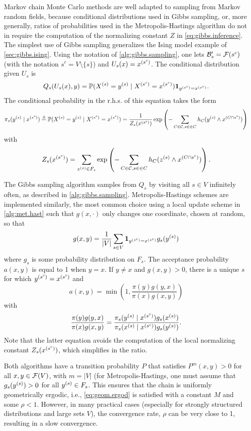 Markov chain Monte Carlo methods are well adapted to sampling from Markov random fields, because conditional distributions used in Gibbs sampling, or, more generally, ratios of probabilities used in the Metropolis-Hastings algorithm do not in require the computation of the normalizing constant $Z$ in \cref{eq:gibbs.inference}. The simplest use of Gibbs sampling generalizes the Ising model example of \cref{sec:gibbs.ising}. Using the notation of \cref{alg:gibbs.sampling}, one lets ${\mathcal B}'_s = {\mathcal F}(s^c)$ (with the notation $s^c = V \setminus \{s\}$) and $U_s(x) = x^{(s^c)}$. The conditional distribution given $U_s$ is 
\[
Q_s(U_s(x), y) = \bm{\mathbb P}(X^{(s)} = y^{(s)}\mid X^{(s^c)} = x^{(s^c)}) {\bm 1}_{y^{(s^c)} = x^{(s^c)}}.
\]
The conditional probability in the r.h.s. of this equation takes the form 
\[
\pi_s(y^{(s)}\mid x^{(s^c)}) \stackrel{{\scriptscriptstyle \Delta}}{=} \bm{\mathbb P}(X^{(s)} = y^{(s)}\mid X^{(s^c)} = x^{(s^c)}) = 
 \frac{1}{Z_s(x^{(s^c)})} \exp\left (- \sum_{C\in {\mathcal C}, s\in \in C} h_C(y^{(s)} \wedge x^{(C\cap s^c)})\right)
\]
with
\[
Z_s(x^{(s^c)}) = \sum_{z^{(s)}\in F_s} \exp\left (- \sum_{C\in {\mathcal C}, s\in \in C} h_C(z^{(s)} \wedge x^{(C\cap s^c)})\right).
\]

The Gibbs sampling algorithm samples from $Q_s$ by visiting all $s\in V$ infinitely often, as described in \cref{alg:gibbs.sampling}. Metropolis-Hastings schemes are implemented similarly, the most common choice using a local update scheme in \cref{alg:met.hast} such that $g(x, \cdot)$ only changes one coordinate, chosen at random, so that
\[
g(x, y) = \frac{1}{|V|}\sum_{s\in V} {\bm 1}_{ y^{(s^c)} = x^{(s^c)}} g_s(y^{(s)})
\]
where $g_s$ is some probability distribution on $F_s$. The acceptance probability $a(x,y)$ is equal to 1 when $y=x$. If $y \neq x$ and $g(x,y) >0$,  there is a unique $s$ for which $y^{(s^c)} = x^{(s^c)}$ and 
\[
a(x,y) = \min\left(1, \frac{\pi(y)g(y,x)}{\pi(x)g(x,y)}\right)
\]
with 
\[
\frac{\pi(y)g(y,x)}{\pi(x)g(x,y)} = \frac{\pi_s(y^{(s)}\mid x^{(s^c)})g_s(x^{(s)})}{\pi_s(x^{(s)}\mid x^{(s^c)})g_s(y^{(s)})}.
\]
Note that the latter equation avoids the computation of the local normalizing constant $Z_s(x^{(s^c)})$, which simplifies in the ratio.

Both algorithms have a transition probability $P$ that satisfies $P^m(x,y) >0$ for all $x,y\in {\mathcal F}(V)$, with $m=|V|$ (for Metropolis-Hastings, one must assume that $g_s(y^{(s)}) > 0$ for all $y^{(s)}\in F_s$. This ensures that the chain is uniformly geometrically ergodic, i.e., \cref{eq:geom.ergod} is satisfied with a constant $M$ and some $\rho<1$. However, in many practical cases (especially for strongly structured distributions and large sets $V$), the convergence rate, $\rho$ can be very close to 1, resulting in a slow convergence. 

